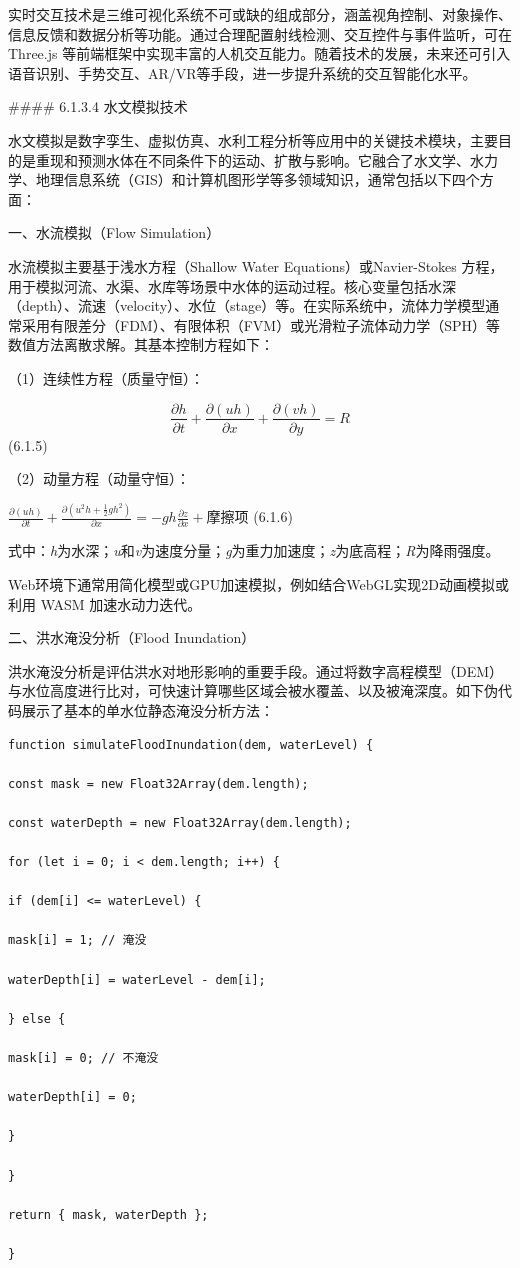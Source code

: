 实时交互技术是三维可视化系统不可或缺的组成部分，涵盖视角控制、对象操作、信息反馈和数据分析等功能。通过合理配置射线检测、交互控件与事件监听，可在 Three.js 等前端框架中实现丰富的人机交互能力。随着技术的发展，未来还可引入语音识别、手势交互、AR/VR等手段，进一步提升系统的交互智能化水平。

\#\#\#\# 6.1.3.4 水文模拟技术

水文模拟是数字孪生、虚拟仿真、水利工程分析等应用中的关键技术模块，主要目的是重现和预测水体在不同条件下的运动、扩散与影响。它融合了水文学、水力学、地理信息系统（GIS）和计算机图形学等多领域知识，通常包括以下四个方面：

一、水流模拟（Flow Simulation）

水流模拟主要基于浅水方程（Shallow Water Equations）或Navier-Stokes 方程，用于模拟河流、水渠、水库等场景中水体的运动过程。核心变量包括水深（depth）、流速（velocity）、水位（stage）等。在实际系统中，流体力学模型通常采用有限差分（FDM）、有限体积（FVM）或光滑粒子流体动力学（SPH）等数值方法离散求解。其基本控制方程如下：

（1）连续性方程（质量守恒）：

\begin{equation}
\frac{{\partial h}}{{\partial t}} + \frac{{\partial (uh)}}{{\partial x}} + \frac{{\partial (vh)}}{{\partial y}} = R
\end{equation} (6.1.5)

（2）动量方程（动量守恒）：

\(\frac{{\partial (uh)}}{{\partial t}} + \frac{{\partial ({u^2}h + \frac{1}{2}g{h^2})}}{{\partial x}} = - gh\frac{{\partial z}}{{\partial x}} + 摩擦项\) (6.1.6)

式中：\emph{h}为水深；\emph{u}和\emph{v}为速度分量；\emph{g}为重力加速度；\emph{z}为底高程；\emph{R}为降雨强度。

Web环境下通常用简化模型或GPU加速模拟，例如结合WebGL实现2D动画模拟或利用 WASM 加速水动力迭代。

二、洪水淹没分析（Flood Inundation）

洪水淹没分析是评估洪水对地形影响的重要手段。通过将数字高程模型（DEM）与水位高度进行比对，可快速计算哪些区域会被水覆盖、以及被淹深度。如下伪代码展示了基本的单水位静态淹没分析方法：

\begin{lstlisting}
function simulateFloodInundation(dem, waterLevel) {

const mask = new Float32Array(dem.length);

const waterDepth = new Float32Array(dem.length);

for (let i = 0; i < dem.length; i++) {

if (dem[i] <= waterLevel) {

mask[i] = 1; // 淹没

waterDepth[i] = waterLevel - dem[i];

} else {

mask[i] = 0; // 不淹没

waterDepth[i] = 0;

}

}

return { mask, waterDepth };

}
\end{lstlisting}

